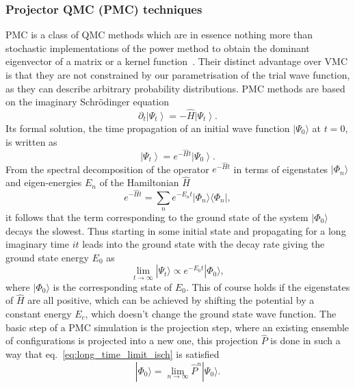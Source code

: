 \subsubsection{Projector QMC (PMC) techniques}
\label{subsubsec-PMC}
PMC is a class of QMC methods which are in essence nothing more than stochastic implementations of the power method to obtain the dominant eigenvector of a matrix or a kernel function~\cite{gubernatis_kawashima_werner_2016}. Their distinct advantage over VMC is that they are not constrained by our parametrisation of the trial wave function, as they can describe arbitrary probability distributions. PMC methods are based on the imaginary Schr\" odinger equation
\begin{equation}
	\label{eq:imgsch}
	\partial_{t}\left|\Psi_{t}\right\rangle=-\hat{H}\left|\Psi_{t}\right\rangle.
\end{equation}
Its formal solution, the time propagation of an initial wave function $|\Psi_0\rangle$ at $t=0$, is written as
\begin{equation}
\left| \Psi_{t} \right\rangle = e^{-\hat{H} t}\left|\Psi_{0}\right\rangle. 
\end{equation}
From the spectral decomposition of the operator $e^{-\hat{H} t}$ in terms of eigenstates $|\Phi_n\rangle$ and eigen-energies $E_n$ of the Hamiltonian $\hat{H}$
\begin{equation}
\label{eq:spectral_decompH}
e^{-\hat{H} t}=\sum_{n} e^{-E_{n} t}|\Phi_n\rangle\langle\Phi_n|, 
\end{equation}
it follows that the term corresponding to the ground state of the system $|\Phi_0\rangle$ decays the slowest. Thus starting in some initial state and propagating for a long imaginary time $it$ leads into the ground state with the decay rate giving the ground state energy $E_0$ as
\begin{equation}
\label{eq:long_time_limit_isch}
\lim_{t \rightarrow \infty} | \Psi_t \rangle \propto e^{-E_0 t} | \Phi_0 \rangle,
\end{equation} 
where $|\Phi_0\rangle$ is the corresponding state of $E_0$. This of course holds if the eigenstates of $\hat{H}$ are all positive, which can be achieved by shifting the potential by a constant energy $E_c$, which doesn't change the ground state wave function. The basic step of a PMC simulation is the projection step, where an existing ensemble of configurations is projected into a new one, this projection $\hat{P}$ is done in such a way that eq.~\eqref{eq:long_time_limit_isch} is satisfied
\begin{equation}
	| \Phi_{0}\rangle = \lim_{n\rightarrow \infty} \hat{P}^n |\Psi_{0}\rangle.
\end{equation}
